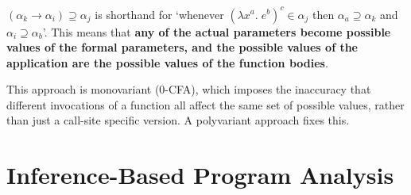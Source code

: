 \documentclass[a4paper, 11pt]{article}
\begin{document}
{{        \((\alpha_k \rightarrow \alpha_i) \supseteq \alpha_j\) is shorthand for `whenever \((\lambda x^a.\;e^b)^c \in \alpha_j\) then \(\alpha_a \supseteq \alpha_k\) and \(\alpha_i \supseteq \alpha_b\)'. This means that \textbf{any of the actual parameters become possible values of the formal parameters, and the possible values of the application are the possible values of the function bodies}.

        This approach is monovariant (0-CFA), which imposes the inaccuracy that different invocations of a function all affect the same set of possible values, rather than just a call-site specific version. A polyvariant approach fixes this.
    }
}
\section*{Inference-Based Program Analysis}
\end{document}
